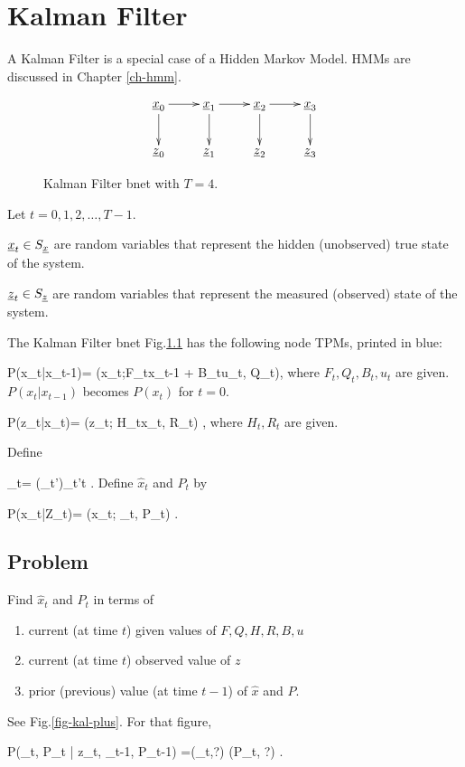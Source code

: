 \chapter{Kalman Filter}\label{ch-kalman}

A Kalman Filter is a special case of a
Hidden Markov Model. HMMs are
 discussed in Chapter \ref{ch-hmm}.

\begin{figure}[h!]
\centering
$$\xymatrix{
\rvx_0\ar[d]\ar[r]&
\rvx_1\ar[d]\ar[r]&
\rvx_2\ar[d]\ar[r]&
\rvx_3\ar[d]\\
\rvz_0&
\rvz_1&
\rvz_2&
\rvz_3
}$$
\caption{Kalman Filter bnet with $T=4$.}
\label{fig-kal}
\end{figure}

Let $t=0, 1, 2, \dots , T-1$.

${\underline{x}}_t\in S_{\underline{x}}$ are
random variables that represent
the hidden (unobserved) true
state of the system.

${\underline{z}}_t\in S_{\underline{z}}$ are 
random variables that represent
the measured (observed) state of the system.


The Kalman Filter bnet Fig.\ref{fig-kal}
has the following
node TPMs,
printed in blue:


\beq\color{blue}
P(x_t|x_{t-1})=
\caln(x_t;F_tx_{t-1} + B_tu_t, Q_t)\;,
\eeq
where $F_t, Q_t, B_t, u_t$
are given. $P(x_t|x_{t-1})$ becomes $P(x_t)$
for $t=0$.

\beq\color{blue}
P(z_t|x_t)=
\caln(z_t; H_tx_t, R_t)
\;,
\eeq
where $H_t, R_t$ are given.

Define

\beq
\rvZ_t= (\rvz_{t'})_{t'\leq t}
\;.
\eeq
Define $\hat{x}_t$ and $P_t$ by

\beq
P(x_t|Z_t)=
\caln(x_t; _t, P_t)
\;.
\eeq

\section{
Problem}
Find $\hat{x}_t$ and $P_t$
in terms of 
\begin{enumerate}
\item
 current (at time $t$)
 given values of
$F,Q,H,R,
 B ,u$
\item
 current (at time $t$)
observed  value of 
$z$
\item
prior (previous)
value (at time $t-1$) of $\hat{x}$
and $P$.
\end{enumerate}
See Fig.\ref{fig-kal-plus}.
For that figure,

\beq \color{blue}
P(_t, P_t | z_t,
_{t-1}, P_{t-1})
=\delta(_t,?)
\delta(P_t, ?)
\;.
\eeq

